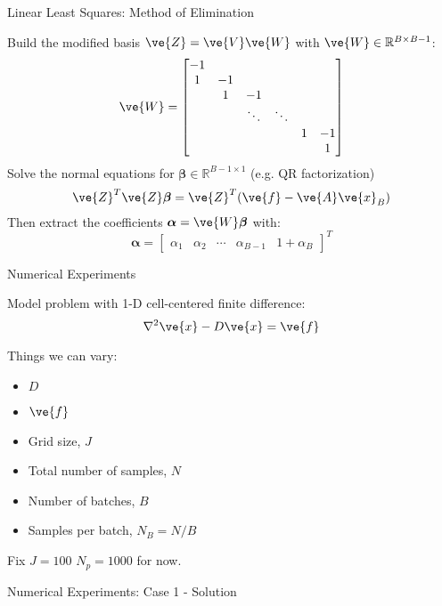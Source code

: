 \documentclass{beamer}
\begin{document}
\begin{frame}{Linear Least Squares: Method of Elimination}

  Build the modified basis $\ve{Z} = \ve{V}\ve{W}$ with $\ve{W} \in
  \mathbb{R}^{B \times B-1}$:
  \[
  \ve{W} =
  \begin{bmatrix}
    -1 &    & & & & \\
     1 & -1 & & & & \\
       &  1 & -1 & & & \\
       &    & \ddots   & \ddots &  & \\
     & & & & 1 & -1 \\
    & & & & & 1 \\
  \end{bmatrix}
  \]
  Solve the normal equations for $\boldsymbol{\beta} \in
  \mathbb{R}^{B-1 \times 1}$ (e.g. QR factorization)
  \[
  \ve{Z}^T \ve{Z} \boldsymbol{\beta} = \ve{Z}^T ( \ve{f} - \ve{A}\ve{x}_B
  )
  \]
  Then extract the coefficients $\boldsymbol{\alpha} =
  \ve{W}\boldsymbol{\beta}$ with:
  \[
  \boldsymbol{\alpha} =
  \begin{bmatrix}
    \alpha_1 & \alpha_2 & \cdots & \alpha_{B-1} & 1 + \alpha_{B}
  \end{bmatrix}^T
  \]

\end{frame}

\begin{frame}{Numerical Experiments}

  Model problem with 1-D cell-centered finite difference:
  \[
  \nabla^2 \ve{x} - D \ve{x} = \ve{f}
  \]

  Things we can vary:
  \begin{itemize}
    \item $D$
    \item $\ve{f}$
    \item Grid size, $J$
    \item Total number of samples, $N$
    \item Number of batches, $B$
    \item Samples per batch, $N_B = N/B$
  \end{itemize}
  
  Fix $J=100$ $N_p=1000$ for now.

\end{frame}

\begin{frame}{Numerical Experiments: Case 1 - Solution}

\end{frame}
\end{document}
